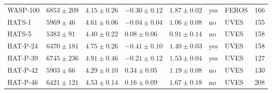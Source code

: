 \documentclass{aa}
\begin{document}
\begin{table}[htb!]
\begin{tabular}{llllllll}
     WASP-100     &  $6853 \pm 209$      &  $4.15 \pm 0.26$    &  $-0.30 \pm 0.12$    &  $1.87 \pm 0.02$             &             yes             & FEROS        &  166  \\  %
       HATS-1     &  $5969 \pm  46$      &  $4.61 \pm 0.06$    &  $-0.04 \pm 0.04$    &  $1.06 \pm 0.08$             &             no              & UVES         &  155  \\  %
       HATS-5     &  $5383 \pm  91$      &  $4.40 \pm 0.22$    &  $ 0.08 \pm 0.06$    &  $0.91 \pm 0.14$             &             no              & UVES         &  158  \\  %
     HAT-P-24     &  $6470 \pm 181$      &  $4.75 \pm 0.26$    &  $-0.41 \pm 0.10$    &  $1.40 \pm 0.03$             &             yes             & UVES         &  158  \\  %
     HAT-P-39     &  $6745 \pm 236$      &  $4.91 \pm 0.46$    &  $-0.21 \pm 0.12$    &  $1.53 \pm 0.04$             &             yes             & UVES         &  127  \\  %
     HAT-P-42     &  $5903 \pm  66$      &  $4.29 \pm 0.10$    &  $ 0.34 \pm 0.05$    &  $1.19 \pm 0.08$             &             no              & UVES         &  130  \\  %
     HAT-P-46     &  $6421 \pm 121$      &  $4.53 \pm 0.14$    &  $ 0.16 \pm 0.09$    &  $1.67 \pm 0.18$             &             no              & UVES         &  208  \\  %

\end{tabular}
\end{table}
\end{document}
